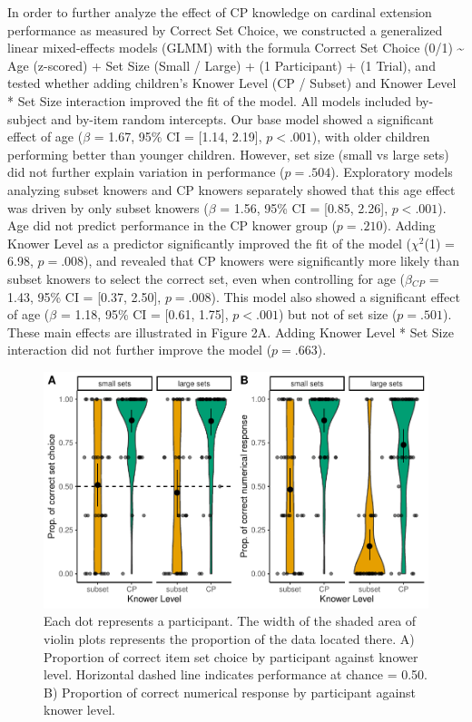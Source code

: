 \documentclass[
  man,floatsintext]{apa7}
\begin{document}
In order to further analyze the effect of CP knowledge on cardinal extension performance as measured by Correct Set Choice, we constructed a generalized linear mixed-effects models (GLMM) with the formula Correct Set Choice (0/1) \textasciitilde{} Age (z-scored) + Set Size (Small / Large) + (1 \textbar{} Participant) + (1 \textbar{} Trial), and tested whether adding children's Knower Level (CP / Subset) and Knower Level * Set Size interaction improved the fit of the model. All models included by-subject and by-item random intercepts.
Our base model showed a significant effect of age (\(\beta\) = 1.67, 95\% CI = {[}1.14, 2.19{]}, \(p < .001\)), with older children performing better than younger children. However, set size (small vs large sets) did not further explain variation in performance (\(p = .504\)). Exploratory models analyzing subset knowers and CP knowers separately showed that this age effect was driven by only subset knowers (\(\beta\) = 1.56, 95\% CI = {[}0.85, 2.26{]}, \(p < .001\)). Age did not predict performance in the CP knower group (\(p = .210\)). Adding Knower Level as a predictor significantly improved the fit of the model (\(\chi^2\)(1) = 6.98, \(p = .008\)), and revealed that CP knowers were significantly more likely than subset knowers to select the correct set, even when controlling for age (\(\beta\)\(_{CP}\) = 1.43, 95\% CI = {[}0.37, 2.50{]}, \(p = .008\)). This model also showed a significant effect of age (\(\beta\) = 1.18, 95\% CI = {[}0.61, 1.75{]}, \(p < .001\)) but not of set size (\(p = .501\)). These main effects are illustrated in Figure 2A. Adding Knower Level * Set Size interaction did not further improve the model (\(p = .663\)).

\begin{figure}
\centering
\includegraphics{2_writeup_files/figure-latex/exp1-plot-1.pdf}
\caption{\label{fig:exp1-plot}Each dot represents a participant. The width of the shaded area of violin plots represents the proportion of the data located there. A) Proportion of correct item set choice by participant against knower level. Horizontal dashed line indicates performance at chance = 0.50. B) Proportion of correct numerical response by participant against knower level.}
\end{figure}
\end{document}
